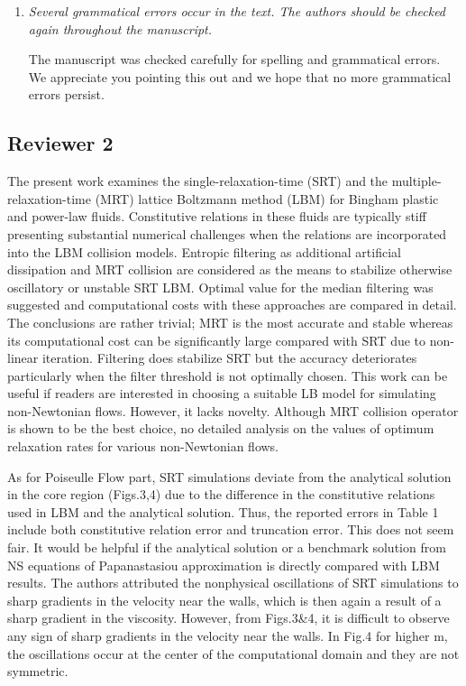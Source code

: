 \documentclass{article}
\begin{document}
\begin{enumerate}
		\item \emph{Several grammatical errors occur in the text. The authors should be checked again throughout the manuscript.}
		
		The manuscript was checked carefully for spelling and grammatical errors. We appreciate you pointing this out and we hope that no more grammatical errors persist.
	
	\end{enumerate}

	\subsection{Reviewer 2}
	  The present work examines the single-relaxation-time (SRT) and the multiple-relaxation-time (MRT) lattice Boltzmann method (LBM) for Bingham plastic and power-law fluids. Constitutive relations in these fluids are typically stiff presenting substantial numerical challenges when the relations are incorporated into the LBM collision models. Entropic filtering as additional artificial dissipation and MRT collision are considered as the means to stabilize otherwise oscillatory or unstable SRT LBM. Optimal value for the median filtering was suggested and computational costs with these approaches are compared in detail. The conclusions are rather trivial; MRT is the most accurate and stable whereas its computational cost can be significantly large compared with SRT due to non-linear iteration. Filtering does stabilize SRT but the accuracy deteriorates particularly when the filter threshold is not optimally chosen. This work can be useful if readers are interested in choosing a suitable LB model for simulating non-Newtonian flows. However, it lacks novelty. Although MRT collision operator is shown to be the best choice, no detailed analysis on the values of optimum relaxation rates for various non-Newtonian flows.
	
	As for Poiseulle Flow part, SRT simulations deviate from the analytical solution in the core region (Figs.3,4) due to the difference in the constitutive relations used in LBM and the analytical solution. Thus, the reported errors in Table 1 include both constitutive relation error and truncation error. This does not seem fair. It would be helpful if the analytical solution or a benchmark solution from NS equations of Papanastasiou approximation is directly compared with LBM results. The authors attributed the nonphysical oscillations of SRT simulations to sharp gradients in the velocity near the walls, which is then again a result of a sharp gradient in the viscosity. However, from Figs.3\&4, it is difficult to observe any sign of sharp gradients in the velocity near the walls. In Fig.4 for higher m, the oscillations occur at the center of the computational domain and they are not symmetric.
	
\end{document}
